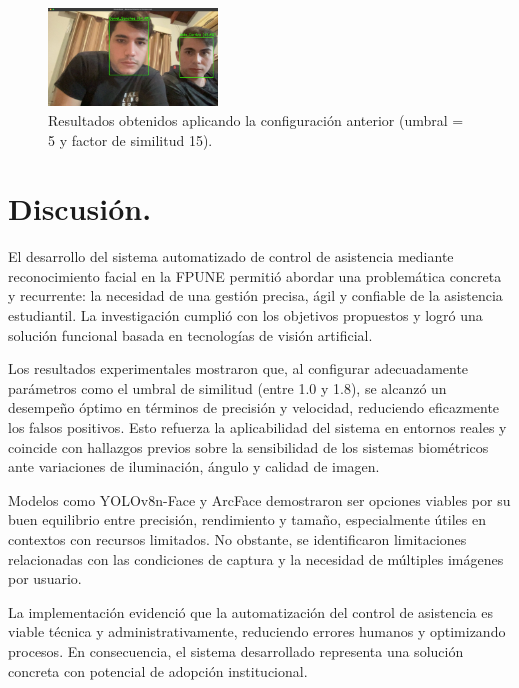 \documentclass[10pt,a4paper]{article}
\begin{document}
\begin{multicols}{2}
\begin{figure}[H]
    \centering
    \includegraphics[width=0.4\textwidth]{imagenes/5.5.jpg}
    \caption{Resultados obtenidos aplicando la configuración anterior (umbral = 5 y factor de similitud 15).}
\end{figure}



\section{Discusión.}

El desarrollo del sistema automatizado de control de asistencia mediante reconocimiento facial en la FPUNE permitió abordar una problemática concreta y recurrente: la necesidad de una gestión precisa, ágil y confiable de la asistencia estudiantil. La investigación cumplió con los objetivos propuestos y logró una solución funcional basada en tecnologías de visión artificial.

Los resultados experimentales mostraron que, al configurar adecuadamente parámetros como el umbral de similitud (entre 1.0 y 1.8), se alcanzó un desempeño óptimo en términos de precisión y velocidad, reduciendo eficazmente los falsos positivos. Esto refuerza la aplicabilidad del sistema en entornos reales y coincide con hallazgos previos sobre la sensibilidad de los sistemas biométricos ante variaciones de iluminación, ángulo y calidad de imagen.

Modelos como YOLOv8n-Face y ArcFace demostraron ser opciones viables por su buen equilibrio entre precisión, rendimiento y tamaño, especialmente útiles en contextos con recursos limitados. No obstante, se identificaron limitaciones relacionadas con las condiciones de captura y la necesidad de múltiples imágenes por usuario.

La implementación evidenció que la automatización del control de asistencia es viable técnica y administrativamente, reduciendo errores humanos y optimizando procesos. En consecuencia, el sistema desarrollado representa una solución concreta con potencial de adopción institucional.






\end{multicols}
\end{document}
